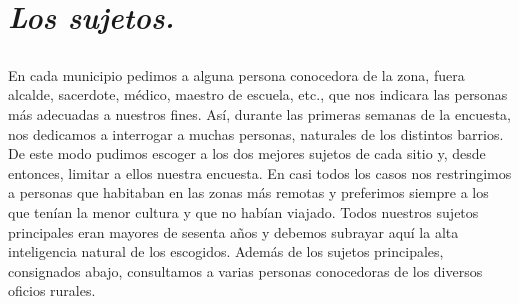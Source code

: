 \section{\emph{Los sujetos.}}

\subsection{} En cada municipio pedimos a alguna persona conocedora de la zona, fuera alcalde, sacerdote, médico, maestro de escuela, etc., que nos indicara las personas más adecuadas a nuestros fines. Así, durante las primeras semanas de la encuesta, nos dedicamos a interrogar a muchas personas, naturales de los distintos barrios. De este modo pudimos escoger a los dos mejores sujetos de cada sitio y, desde entonces, limitar a ellos nuestra encuesta. En casi todos los casos nos restringimos a personas que habitaban en las zonas más remotas y preferimos siempre a los que tenían la menor cultura y que no habían viajado. Todos nuestros sujetos principales eran mayores de sesenta años y debemos subrayar aquí la alta inteligencia natural de los escogidos. Además de los sujetos principales, consignados abajo, consultamos a varias personas conocedoras de los diversos oficios rurales.

